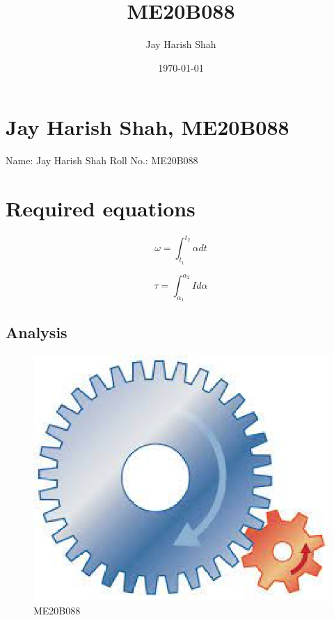 \documentclass[a4paper, 12pt]{article}
\begin{document}
\title{ME20B088}
\author{Jay Harish Shah}
\date{\today}
\maketitle

\tableofcontents

\listoffigures

\section{Jay Harish Shah, ME20B088}
Name: Jay Harish Shah
Roll No.: ME20B088

\section{Required equations}
\begin{equation}
\omega =\int_{t_1}^{t_2}{ \alpha dt}	
\label{eqn:omega}
\end{equation}

\begin{equation}
\tau = \int_{\alpha_1}^{\alpha_2}{I d\alpha}
\label{eqn:tau}
\end{equation}

\subsection{Analysis}
\begin{figure}
	\begin{center}
		\includegraphics[scale=0.5]{me20b088.eps}
	\end{center}
	\caption{ME20B088}
	\label{fig1}
\end{figure}
\end{document}
